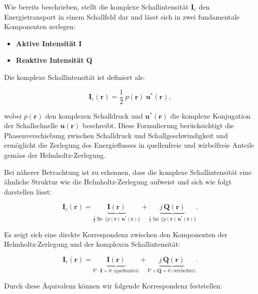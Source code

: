 Wie bereits beschrieben, stellt die komplexe Schallintensität $\mathbf{I}_c$ den Energietransport in einem Schallfeld dar und lässt sich in zwei fundamentale Komponenten zerlegen:
 
\begin{itemize}
\item \textbf{Aktive Intensität} $\mathbf{I}$
\item \textbf{Reaktive Intensität} $\mathbf{Q}$
\end{itemize}
 
Die komplexe Schallintensität ist definiert als:
 
\begin{equation}
\mathbf{I}_c (\mathbf{r}) = \frac{1}{2} \: p(\mathbf{r}) \: \mathbf{u}^{*}(\mathbf{r}),
\end{equation}
 
\noindent wobei $p(\mathbf{r})$ den komplexen Schalldruck und $\mathbf{u}^{*}(\mathbf{r})$ die komplexe Konjugation der Schallschnelle $\mathbf{u}(\mathbf{r})$ beschreibt. Diese Formulierung berücksichtigt die Phasenverschiebung zwischen Schalldruck und Schallgeschwindigkeit und ermöglicht die Zerlegung des Energieflusses in quellenfreie und wirbelfreie Anteile gemäss der Helmholtz-Zerlegung.
 
Bei näherer Betrachtung ist zu erkennen, dass die komplexe Schallintensität eine ähnliche Struktur wie die Helmholtz-Zerlegung aufweist und sich wie folgt darstellen lässt:
 
\begin{equation}
\mathbf{I}_c (\mathbf{r}) = \underbrace{\mathbf{I}(\mathbf{r})}_{\frac{1}{2} \operatorname{Re} \, \{ p(\mathbf{r}) \, \mathbf{u}^*(\mathbf{r}) \}} + \underbrace{j\,\mathbf{Q}(\mathbf{r})}_{\frac{1}{2} \operatorname{Im} \, \{ p(\mathbf{r}) \, \mathbf{u}^*(\mathbf{r}) \}}.
\end{equation}
 
Es zeigt sich eine direkte Korrespondenz zwischen den Komponenten der Helmholtz-Zerlegung und der komplexen Schallintensität:
 
\begin{equation}
\mathbf{I}_c (\mathbf{r}) = \underbrace{\mathbf{I}(\mathbf{r})}_{\nabla \cdot \mathbf{I} = 0 \text{ (quellenfrei)}} + \underbrace{j\,\mathbf{Q}(\mathbf{r})}_{\nabla \times \mathbf{Q} = 0 \text{ (wirbelfrei)}}.
\end{equation}
 
\noindent Durch diese Äquivalenz können wir folgende Korrespondenz feststellen:
 
